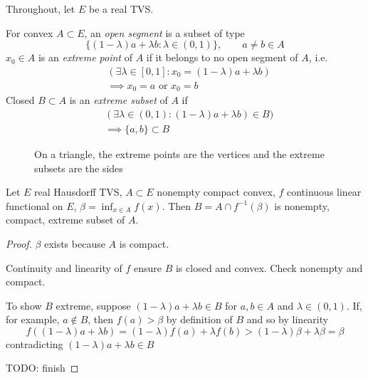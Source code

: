 
Throughout, let $E$ be a real TVS.

\begin{definition}
  For convex $A \subset E$, an \emph{open segment} is
  a subset of type
  \[
    \{(1-\lambda) a + \lambda b : \lambda \in (0,1) \},\qquad a\neq b \in A
  \]
  $x_0 \in A$ is an \emph{extreme point} of $A$ if it belongs to no open segment
  of $A$, i.e.
  \begin{align*}
    &(\exists \lambda \in [0,1] : x_0 = (1-\lambda) a + \lambda b) \\
    &\implies x_0 = a \text{ or } x_0 = b
  \end{align*}
  Closed $B \subset A$ is an \emph{extreme subset} of $A$ if
  \begin{align*}
    &(\exists \lambda \in (0,1) : (1-\lambda) a + \lambda b) \in B) \\
    &\implies \{a,b\} \subset B
  \end{align*}
\end{definition}

\begin{figure}[ht]
    \centering
    \caption{On a triangle, the extreme points are the vertices and the extreme subsets are the sides}
    \label{fig:extreme-points}
\end{figure}

\begin{lemma}
  \label{lem:cvx-subset-has-extreme-subset}
  Let $E$ real Hausdorff TVS, $A \subset E$ nonempty compact convex,
  $f$ continuous linear functional on $E$, $\beta = \inf_{x \in A} f(x)$.
  Then $B = A \cap f^{-1}(\beta)$ is nonempty, compact, extreme subset of $A$.
\end{lemma}

\begin{proof}
  $\beta$ exists because $A$ is compact.

  Continuity and linearity of $f$ ensure $B$ is closed and convex.
  Check nonempty and compact.

  To show $B$ extreme, suppose $(1-\lambda)a + \lambda b \in B$
  for $a,b \in A$ and $\lambda \in (0,1)$.
  If, for example, $a \not\in B$, then $f(a) > \beta$ by definition
  of $B$ and so by linearity
  \[
    f((1-\lambda) a + \lambda b)
    = (1 - \lambda) f(a) + \lambda f(b) > (1 - \lambda) \beta + \lambda \beta
    = \beta
  \]
  contradicting $(1-\lambda)a + \lambda b \in B$

  TODO: finish
\end{proof}

